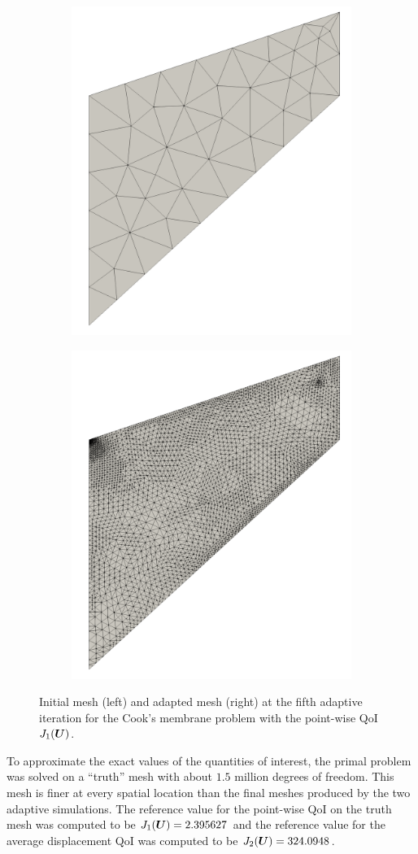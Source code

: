 \begin{figure}[ht!]
\centering
\begin{subfigure}{.5\textwidth}
\centering
\includegraphics[width=.6\linewidth]{img/mech_cooks_pw_initial_mesh.png}
\end{subfigure}%
\begin{subfigure}{.5\textwidth}
\centering
\includegraphics[width=.6\linewidth]{img/mech_cooks_pw_final_mesh.png}
\end{subfigure}
\caption{Initial mesh (left) and adapted mesh (right) at the fifth
adaptive iteration for the Cook's membrane problem with the point-wise
QoI $J_1(\boldsymbol{U})$.}
\label{fig:mech_cooks_pw_meshes}
\end{figure}

To approximate the exact values of the quantities of interest, the primal
problem was solved on a ``truth'' mesh with about $1.5$ million degrees of
freedom. This mesh is finer at every spatial location than the final meshes
produced by the two adaptive simulations. The reference value for the
point-wise QoI on the truth mesh was computed to be
$J_1(\boldsymbol{U}) = 2.395627$ and the reference value for the average displacement
QoI was computed to be $J_2(\boldsymbol{U}) = 324.0948$.

